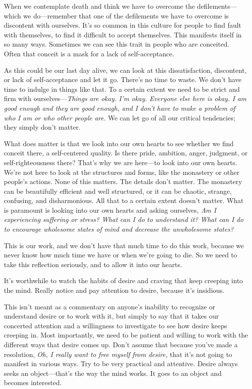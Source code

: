 When we contemplate death and think we have to overcome the 
defilements---which we do---remember that one of the defilements we 
have to overcome is discontent with ourselves. It's so common in this 
culture for people to find fault with themselves, to find it difficult 
to accept themselves. This manifests itself in so many ways. Sometimes 
we can see this trait in people who are conceited. Often that conceit 
is a mask for a lack of self-acceptance.

As this could be our last day alive, we can look at this 
dissatisfaction, discontent, or lack of self-acceptance and let it go. 
There's no time to waste. We don't have time to indulge in things like 
that. To a certain extent we need to be strict and firm with 
ourselves---\emph{Things are okay. I'm okay. Everyone else here is 
okay. I am good enough and they are good enough, and I don't have to 
make a problem of who I am or who other people are.} We can let go of 
all our critical tendencies; they simply don't matter.

What does matter is that we look into our own hearts to see whether we 
find conceit there, a self-centered quality. Is there pride, ambition, 
anger, judgment, or self-righteousness there? That's why we are 
here---to look into our own hearts. We're not here to look at the 
structures and forms, like the monastery or other people's actions. 
None of this matters. The details don't matter. The monastery can be 
beautifully efficient and well structured, or it can be chaotic, 
strange, confusing, and disharmonious. All that to a certain extent 
doesn't matter. What is paramount is looking into our own hearts and 
asking ourselves, \emph{Am I experiencing suffering or stress? What can 
I do to understand it? What can I do to encourage wholesome states of 
mind and decrease the unwholesome states?}

This is our work, and we don't have that much time to do this work, 
because we never know how much time we have or when we're going to die. 
So we need to take this reflection seriously, and to allow it into our 
hearts.


It's worthwhile to watch the habits of desire and craving that keep 
creeping into the mind. Really notice and pay attention to desire, 
because it's insidious.

This isn't meant as a commentary on anyone's inability to recognize or 
understand desire or to work with it, but simply to say that it takes 
our concerted attention and a willingness to investigate to see how 
desire keeps creeping in. Most importantly, we need to be patient and 
willing to work with the different ways that desire comes up. Don't 
assume that because you've made a resolution, \emph{Oh, I really want 
to free myself from desire,} that it's not going to manifest in various 
ways. Try to be very practical and attentive. Desire always seeks an 
object---that's the way the mind works. It goes to an object and 
becomes interested.

